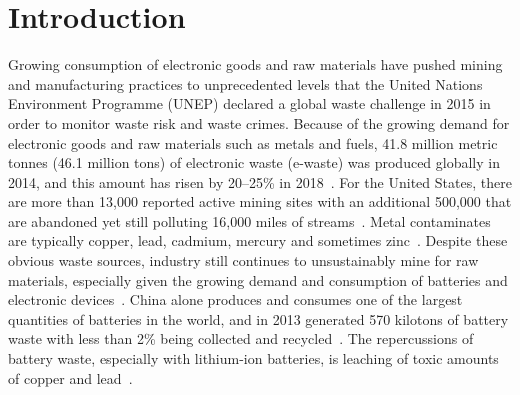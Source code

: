 \documentclass[../main/main]{subfiles}
\begin{document}
\section{Introduction}
Growing consumption of electronic goods and raw materials have pushed mining and manufacturing practices to unprecedented levels that the United Nations Environment Programme (UNEP) declared a global waste challenge in 2015 in order to monitor waste risk and waste crimes\cite{rucevska2015}. Because of the growing demand for electronic goods and raw materials such as metals and fuels, 41.8 million metric tonnes (46.1 million tons) of electronic waste (e-waste) was produced globally in 2014, and this amount has risen by 20--25\% in 2018~\cite{rucevska2015,balde2017}.
For the United States, there are more than 13,000 reported active mining sites with an additional 500,000 that are abandoned yet still polluting 16,000 miles of streams~\cite{centerfordiseasecontrolandprevention2018,degraff2007addressing}.
Metal contaminates are typically copper, lead, cadmium, mercury and sometimes zinc~\cite{rucevska2015,rucevska2015}.
Despite these obvious waste sources, industry still continues to unsustainably mine for raw materials, especially given the growing demand and consumption of batteries and electronic devices~\cite{kang2013}. China alone produces and consumes one of the largest quantities of batteries in the world, and in 2013 generated 570 kilotons of battery waste with less than 2\% being collected and recycled~\cite{song2017}. The repercussions of battery waste, especially with lithium-ion batteries, is leaching of toxic amounts of copper and lead~\cite{kang2013}.
\end{document}
